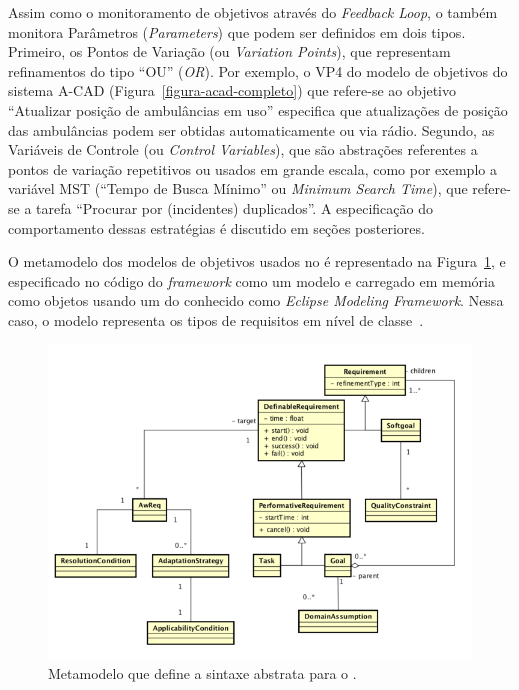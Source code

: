 Assim como o monitoramento de objetivos através do \textit{Feedback Loop}, o \zanshin também monitora Parâmetros (\textit{Parameters}) que podem ser definidos em dois tipos. Primeiro, os Pontos de Variação (ou \textit{Variation Points}), que representam refinamentos do tipo ``OU'' (\textit{OR}). Por exemplo, o VP4 do modelo de objetivos do sistema A-CAD (Figura~\ref{figura-acad-completo}) que refere-se ao objetivo ``Atualizar posição de ambulâncias em uso'' especifica que atualizações de posição das ambulâncias podem ser obtidas automaticamente ou via rádio. Segundo, as Variáveis de Controle (ou \textit{Control Variables}), que são abstrações referentes a pontos de variação repetitivos ou usados em grande escala, como por exemplo a variável MST (``Tempo de Busca Mínimo'' ou \textit{Minimum Search Time}), que refere-se a tarefa ``Procurar por (incidentes) duplicados''. A especificação do comportamento dessas estratégias é discutido em seções posteriores.

O metamodelo dos modelos de objetivos usados no \zanshin é representado na Figura~\ref{figura-metamodelo-antigo}, e especificado no código do \textit{framework} como um modelo \ecore e carregado em memória como objetos \java usando um \framework do \eclipse conhecido como \textit{Eclipse Modeling Framework}. Nessa caso, o modelo \ecore representa os tipos de requisitos em nível de classe~\cite{souza2013requirements}. 


\begin{figure}
	\centering
	\includegraphics[width=1\textwidth]{figuras/metamodelos/metamodelo-zanshin-antigo.png}
	\caption{Metamodelo que define a sintaxe abstrata para o \zanshin.}
	\label{figura-metamodelo-antigo}
\end{figure}

